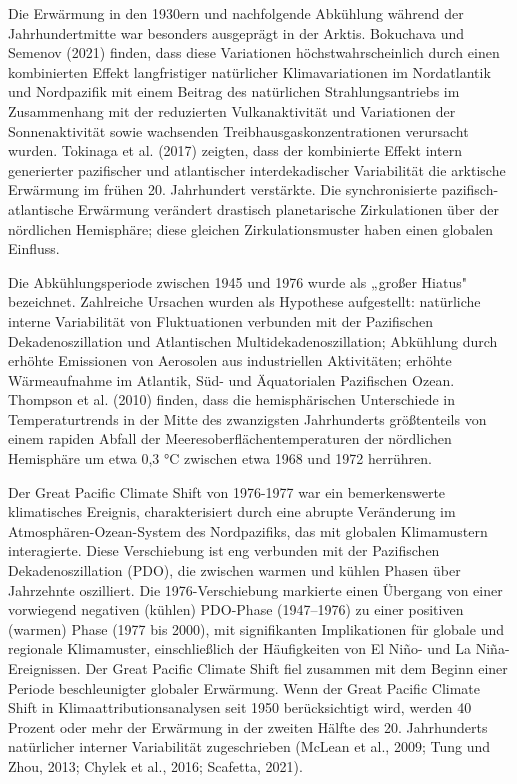 \documentclass[12pt,paper=a4,DIV=12,parskip=never,chapterprefix=false,headings=standardclasses]{scrreprt}
\begin{document}
Die Erwärmung in den 1930ern und nachfolgende Abkühlung während der Jahrhundertmitte war besonders ausgeprägt in der Arktis. Bokuchava und Semenov (2021) finden, dass diese Variationen höchstwahrscheinlich durch einen kombinierten Effekt langfristiger natürlicher Klimavariationen im Nordatlantik und Nordpazifik mit einem Beitrag des natürlichen Strahlungsantriebs im Zusammenhang mit der reduzierten Vulkanaktivität und Variationen der Sonnenaktivität sowie wachsenden Treibhausgaskonzentrationen verursacht wurden. Tokinaga et al. (2017) zeigten, dass der kombinierte Effekt intern generierter pazifischer und atlantischer interdekadischer Variabilität die arktische Erwärmung im frühen 20. Jahrhundert verstärkte. Die synchronisierte pazifisch-atlantische Erwärmung verändert drastisch planetarische Zirkulationen über der nördlichen Hemisphäre; diese gleichen Zirkulationsmuster haben einen globalen Einfluss.

Die Abkühlungsperiode zwischen 1945 und 1976 wurde als „großer Hiatus" bezeichnet. Zahlreiche Ursachen wurden als Hypothese aufgestellt: natürliche interne Variabilität von Fluktuationen verbunden mit der Pazifischen Dekadenoszillation und Atlantischen Multidekadenoszillation; Abkühlung durch erhöhte Emissionen von Aerosolen aus industriellen Aktivitäten; erhöhte Wärmeaufnahme im Atlantik, Süd- und Äquatorialen Pazifischen Ozean. Thompson et al. (2010) finden, dass die hemisphärischen Unterschiede in Temperaturtrends in der Mitte des zwanzigsten Jahrhunderts größtenteils von einem rapiden Abfall der Meeresoberflächentemperaturen der nördlichen Hemisphäre um etwa 0,3 °C zwischen etwa 1968 und 1972 herrühren.

Der Great Pacific Climate Shift von 1976-1977 war ein bemerkenswerte klimatisches Ereignis, charakterisiert durch eine abrupte Veränderung im Atmosphären-Ozean-System des Nordpazifiks, das mit globalen Klimamustern interagierte. Diese Verschiebung ist eng verbunden mit der Pazifischen Dekadenoszillation (PDO), die zwischen warmen und kühlen Phasen über Jahrzehnte oszilliert. Die 1976-Verschiebung markierte einen Übergang von einer vorwiegend negativen (kühlen) PDO-Phase (1947–1976) zu einer positiven (warmen) Phase (1977 bis 2000), mit signifikanten Implikationen für globale und regionale Klimamuster, einschließlich der Häufigkeiten von El Niño- und La Niña-Ereignissen. Der Great Pacific Climate Shift fiel zusammen mit dem Beginn einer Periode beschleunigter globaler Erwärmung. Wenn der Great Pacific Climate Shift in Klimaattributionsanalysen seit 1950 berücksichtigt wird, werden 40 Prozent oder mehr der Erwärmung in der zweiten Hälfte des 20. Jahrhunderts natürlicher interner Variabilität zugeschrieben (McLean et al., 2009; Tung und Zhou, 2013; Chylek et al., 2016; Scafetta, 2021).
\end{document}
